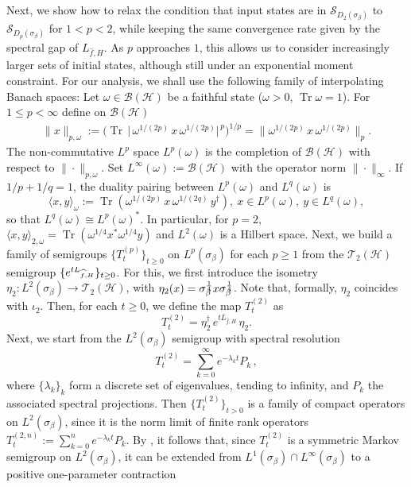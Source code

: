 \documentclass[11pt]{amsart}
\newcommand{\1}{\mathbbm{1}}
\newcommand{\Tr}{\operatorname{Tr}}
\newcommand{\cH}{\mathcal{H}}
\theoremstyle{plain}
\theoremstyle{definition}
\theoremstyle{remark}
\numberwithin{equation}{section}
\begin{document}
\noindent Next, we show how to relax the condition that input states are in $\mathscr{S}_{D_2(\sigma_\beta)}$ to $\mathscr{S}_{D_p(\sigma_\beta)}$ for $1<p<2$, while keeping the same convergence rate given by the spectral gap of $L_{\widehat{f},H}$. As $p$ approaches $1$, this allows us to consider increasingly larger sets of initial states, although still under an exponential moment constraint. For our analysis, we shall use the following family of interpolating Banach spaces:
Let \(\omega\in\mathscr B(\mathcal H)\) be a faithful state (\(\omega>0\), \(\Tr\omega=1\)).
For \(1\le p<\infty\) define on \(\mathscr{B}(\mathcal{H})\)
\begin{equation}
\label{eq:norms}
\begin{split}
  \|x\|_{p,\omega}
  := \Big(\Tr\,\big|\,\omega^{1/(2p)}\,x\,\omega^{1/(2p)}\big|^{\,p}\Big)^{1/p} =\Big\|\omega^{1/(2p)}\,x\,\omega^{1/(2p)}\Big\|_{p}.
  \end{split}
\end{equation}
The non\mbox{-}commutative \(L^p\) space \(L^p(\omega)\) is the completion of \(\mathscr{B}(\mathcal H)\)
with respect to \(\|\cdot\|_{p,\omega}\). 
Set \(L^\infty(\omega):=\mathscr{B}(\mathcal H)\) with the operator norm \(\|\cdot\|_\infty\).
If \(1/p+1/q=1\), the duality pairing between \(L^p(\omega)\) and \(L^q(\omega)\) is
\[
  \langle x, y\rangle_\omega
  := \Tr\!\left(\omega^{1/(2p)}\,x\,\omega^{1/(2q)}\,y^{\dagger}\right),
 \ x\in L^p(\omega),\ y\in L^q(\omega),
\]
so that \(L^q(\omega)\cong L^p(\omega)^{*}\).
In particular, for \(p=2\),
\(\langle x,y\rangle_{2,\omega}=\Tr(\omega^{1/4}x^{*} \omega^{1/4}y)\) and \(L^2(\omega)\) is a Hilbert space.
 Next, we build a family of semigroups $\{T^{(p)}_t\}_{t\ge 0}$ on $L^p(\sigma_{\beta})$ for each $p\ge 1$ from the $\mathscr{T}_2(\cH)$ semigroup $\{e^{\smash{tL_{\widehat{f},H}}}\}_{\smash{t\ge 0}}$. For this, we first introduce the isometry $\eta_2: L^2(\sigma_\beta)\to \mathscr{T}_2(\cH)$, with $\eta_2(x)=\sigma_\beta^{\smash{\frac{1}{4}}}x\sigma_\beta^{\smash{\frac{1}{4}}}$. Note that, formally, $\eta_2$ coincides with $\iota_2$. Then, for each $t\ge0$, we define the map $T_t^{(2)}$ as 
\[T^{(2)}_t=\eta_2^\dagger\, e^{tL_{\widehat{f},H}}\,\eta_2.\]
Next, we start from the $L^2(\sigma_\beta)$ semigroup with spectral resolution
\[ T^{(2)}_t = \sum_{k=0}^{\infty} e^{-\lambda_k t} P_k \,, \]
where $\{\lambda_k\}_k$ form a discrete set of eigenvalues, tending to infinity, and $P_k$ the associated spectral projections. 
Then $\{T^{(2)}_t\}_{t>0}$ is a family of compact operators on $L^2(\sigma_\beta)$, since it is the norm limit of finite rank operators $T^{(2,n)}_t:=\sum_{k=0}^{n} e^{-\lambda_kt} P_k.$ By \cite[Theorem 1.4.1]{Davies_1989}, it follows that, since $T^{(2)}_t$ is a symmetric Markov semigroup on $L^2(\sigma_\beta)$, it can be extended from $L^1(\sigma_\beta) \cap L^\infty(\sigma_\beta)$ to a positive one-parameter contraction
\end{document}
